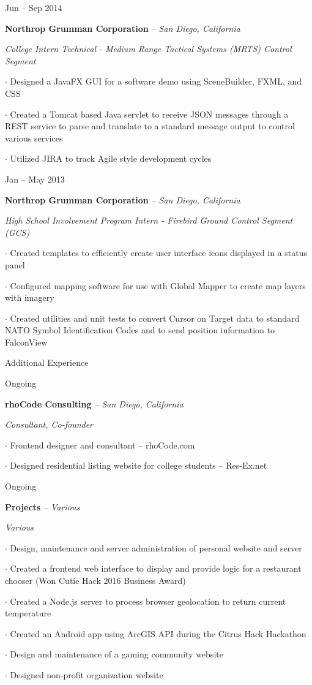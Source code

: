 \documentclass{article}
\newcommand{\entry}[5]{%
	{\fontsize{11pt}{11pt} \parbox{2.75cm}{ #1 } }%
	\parbox[t]{15cm}{%
		\fontsize{11pt}{11pt}\textbf{#2}%
		{\footnotesize\emph{-- #3}}%


		{\fontsize{11pt}{11pt}%
			\emph{#4}%
		}
		
		
		\parbox[t]{14.5cm}{
			\hangparas{0.5cm}{1}
			\fontsize{11pt}{11pt}	#5%
		}
	}
	\vspace{0.2cm}%
}
\renewcommand{\section}[1]{
	\par\vspace{0.1cm}
	{%
		\fontsize{12pt}{12pt}\fontseries{b}\selectfont
		{#1}
	}
	\par\vspace{0.1cm}
}
\begin{document}
\entry
{Jun -- Sep 2014}
{Northrop Grumman Corporation}
{San Diego, California}
{College Intern Technical - Medium Range Tactical Systems (MRTS) Control Segment}
{
	$\cdot$ Designed a JavaFX GUI for a software demo using SceneBuilder, FXML, and CSS
	
	$\cdot$ Created a Tomcat based Java servlet to receive JSON messages through a REST service to parse and translate to a standard message output to control various services
	
	$\cdot$ Utilized JIRA to track Agile style development cycles
}

\entry
{Jan -- May 2013}
{Northrop Grumman Corporation}
{San Diego, California}
{High School Involvement Program Intern - Firebird Ground Control Segment (GCS)}
{
	$\cdot$ Created templates to efficiently create user interface icons displayed in a status panel

	$\cdot$ Configured mapping software for use with Global Mapper to create map layers with imagery

	$\cdot$ Created utilities and unit tests to convert Cursor on Target data to standard NATO Symbol Identification Codes and to send position information to FalconView
}


\section{Additional Experience}

\entry
{Ongoing}
{rhoCode Consulting}
{San Diego, California}
{Consultant, Co-founder}
{
	$\cdot$ Frontend designer and consultant -- rhoCode.com

	$\cdot$ Designed residential listing website for college students -- Res-Ex.net
}

\entry
{Ongoing}
{Projects}
{Various}
{Various}
{%
	$\cdot$ Design, maintenance and server administration of personal website and server

	$\cdot$ Created a frontend web interface to display and provide logic for a restaurant chooser (Won Cutie Hack 2016 Business Award)

	$\cdot$ Created a Node.js server to process browser geolocation to return current temperature

	$\cdot$ Created an Android app using ArcGIS API during the Citrus Hack Hackathon

	$\cdot$ Design and maintenance of a gaming community website

	$\cdot$ Designed non-profit organization website

}
\end{document}
